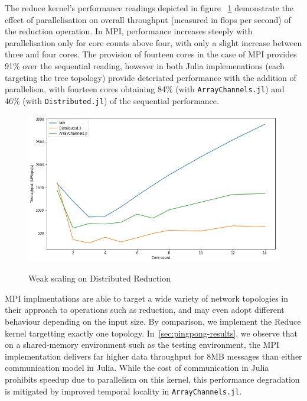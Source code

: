 The reduce kernel's performance readings depicted in figure
~\ref{fig:reduce-results} demonstrate the effect of parallelisation on
overall throughput (measured in flops per second) of the reduction
operation. In MPI, performance increases steeply with parallelisation
only for core counts above four, with only a slight increase between
three and four cores. The provision of fourteen cores in the case of MPI
provides 91\% over the sequential reading, however in both Julia
implemenations (each targeting the tree topology) provide deteriated
performance with the addition of parallelism, with fourteen cores
obtaining 84\% (with \texttt{ArrayChannels.jl}) and 46\% (with
\texttt{Distributed.jl}) of the sequential performance.\\

\begin{figure}[htb]
  \includegraphics[width=\linewidth]{figs/reduce.png}
  \label{fig:reduce-results}
  \caption{Weak scaling on Distributed Reduction}
\end{figure}

MPI implmentations are able to target a wide variety of network
topologies in their approach to operations such as reduction, and may
even adopt different behaviour depending on the input size. By
comparison, we implement the Reduce kernel targetting exactly one
topology. In~\ref{sec:pingpong-results}, we observe that on a
shared-memory environment such as the testing environment, the MPI
implementation delivers far higher data throughput for 8MB messages than
either communication model in Julia. While the cost of communication in
Julia prohibits speedup due to parallelism on this kernel, this
performance degradation is mitigated by improved temporal locality in
\texttt{ArrayChannels.jl}.\\

